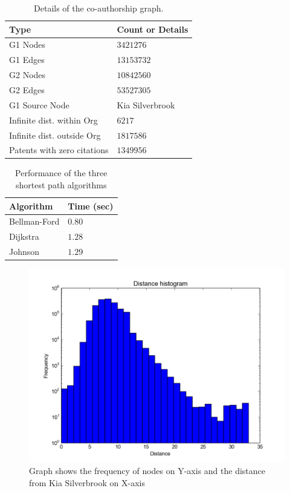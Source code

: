 \begin{table}[t]
\centering

		\begin{tabular}{| l | l |}
		\hline
		
		{Type} & {Count or Details} \\
		\hline
		\hline
		G1 Nodes & $3421276$ \\
		G1 Edges & $13153732$ \\
		G2 Nodes & $10842560$ \\
		G2 Edges & $53527305$ \\
		G1 Source Node & Kia Silverbrook \\
		Infinite dist. within Org & $6217$\\
		Infinite dist. outside Org& $1817586$ \\
		Patents with zero citations & $1349956$ \\
		\hline
	\end{tabular}		
	\caption { Details of the co-authorship graph.}
	\label{tab:model}
\end{table}	

\begin{table}[t]
\centering

	\begin{tabular}{| l | l |}
		\hline
		{Algorithm} & {Time (sec)} \\
		\hline
		\hline
		Bellman-Ford & $0.80$ \\
		Dijkstra & $1.28$ \\
		Johnson & $1.29$ \\
		\hline
	\end{tabular}
	\caption { Performance of the three shortest path algorithms}
	\label{tab:algos}
\end{table}		

\begin{figure}[t]
  \includegraphics[scale=0.425]{figure/silver_brook_distance.pdf}
  \caption{ Graph shows the frequency of nodes on Y-axis and the distance from
Kia Silverbrook on X-axis }
\label{fig:distance}
\end{figure}

